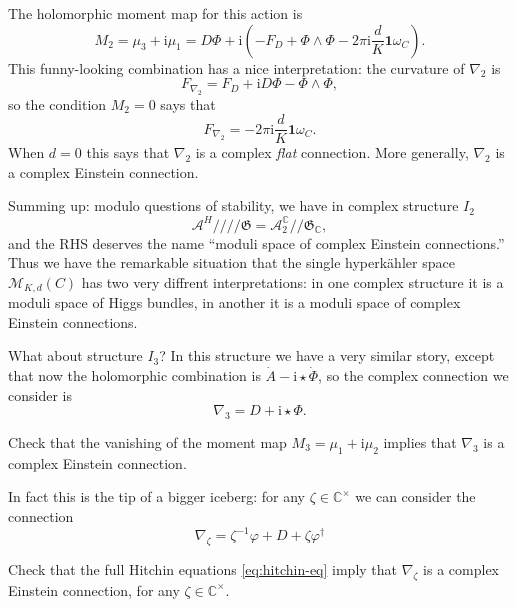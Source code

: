 \documentclass[12pt,letterpaper,reqno]{article}
\numberwithin{equation}{section}
\newcommand{\fG}{{\mathfrak G}}
\newcommand{\cM}{\ensuremath{\mathcal M}}
\newcommand{\cA}{\ensuremath{\mathcal A}}
\newcommand{\C}{\ensuremath{\mathbb C}}
\newcommand{\kq}{/\!\!/}
\newcommand{\hk}{hyperk\"ahler\xspace}
\newcommand{\hkq}{/\!\!/\!\!/\!\!/}
\newcommand{\I}{{\mathrm i}}
\newcommand\bid{{\mathbf 1}}
\newcommand{\ti}[1]{\textit{#1}}
\begin{document}
The holomorphic moment
map for this action is
\begin{equation}
  M_2 = \mu_3 + \I \mu_1 = D \Phi + \I \left(-F_D + \Phi \wedge \Phi - 2 \pi \I \frac{d}{K} \bid \omega_C\right).
\end{equation}
This funny-looking combination has a nice interpretation:
the curvature of $\nabla_2$ is
\begin{equation}
  F_{\nabla_2} = F_D + \I D\Phi - \Phi \wedge \Phi,
\end{equation}
so the condition $M_2 = 0$ says that
\begin{equation}
  F_{\nabla_2} = - 2\pi \I \frac{d}{K} \bid \omega_C.
\end{equation}
When $d=0$ this says that $\nabla_2$ is a complex \ti{flat}
connection. More generally, $\nabla_2$ is a complex Einstein connection.

Summing up: modulo questions of stability, we have in complex
structure $I_2$
\begin{equation}
  \cA^H \hkq \fG = \cA_2^\C \kq \fG_\C,
\end{equation}
and the RHS deserves the name ``moduli space of complex Einstein connections.''
Thus we have the remarkable situation that the single \hk space
$\cM_{K,d}(C)$ has two very diffrent interpretations:
in one complex structure it is a moduli space of Higgs bundles,
in another it is a moduli space of complex Einstein connections.

What about structure $I_3$? In this structure we have a very similar
story, except that now the holomorphic combination is
$\dot A - \I \star \dot \Phi$, so the complex connection we consider is
\begin{equation}
  \nabla_3 = D + \I \star \Phi.
\end{equation}

\begin{exercise}
Check that the vanishing of the moment map $M_3 = \mu_1 + \I \mu_2$
implies that $\nabla_3$ is a complex Einstein connection.
\end{exercise}

In fact this is the tip of a bigger iceberg:
for any $\zeta \in \C^\times$ we can consider the connection
\begin{equation} \label{eq:nabla-zeta}
  \nabla_\zeta = \zeta^{-1} \varphi + D + \zeta \varphi^\dagger
\end{equation}

\begin{exercise}
Check that the full Hitchin equations \eqref{eq:hitchin-eq}
imply that $\nabla_\zeta$ is a complex Einstein connection,
for any $\zeta \in \C^\times$.
\end{exercise}
\end{document}
